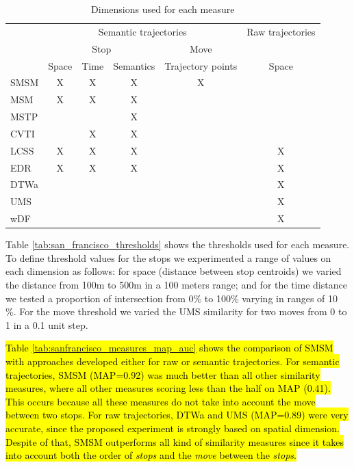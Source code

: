 \documentclass[12pt]{article}
\begin{document}
\begin{table}[!h]
\scriptsize
  \centering
  \begin{tabular}{|l|c|c|c|c|c|}
  	\hline
  & \multicolumn{4}{c|}{Semantic trajectories} & \multicolumn{1}{c|}{Raw trajectories} \\
 	\cline{2-5}
  & \multicolumn{3}{c|}{Stop} & \multicolumn{1}{c|}{Move} & \multicolumn{1}{c|}{} \\
 	\cline{2-6}
  & Space & Time & Semantics & Trajectory points & Space\\
  	\hline
 SMSM & X & X & X & X & \\
 MSM & X & X & X & &\\
 MSTP &  &  & X & & \\
 CVTI & & X & X & & \\
 LCSS & X & X & X & & X \\
 EDR & X & X & X & & X \\
 DTWa &  &  &  & & X \\
 UMS & & & & & X \\
 wDF & & & & & X \\
    \hline
  \end{tabular}
  \caption{Dimensions used for each measure}
  \label{tab:san_francisco_measures}
\end{table}

Table \ref{tab:san_francisco_thresholds} shows the  thresholds used for each measure. To define threshold values for the stops we experimented  a range of values on each dimension as follows: for space (distance between stop centroids) we varied the distance from 100m to 500m in a 100 meters range; and for the time distance we tested a proportion of intersection from 0\% to 100\% varying in ranges of 10 \%. For the move threshold we varied the UMS similarity for two moves from 0 to 1 in a 0.1 unit step.

\hl{Table {\ref{tab:sanfrancisco_measures_map_auc}} shows the comparison of SMSM with approaches developed either for raw or semantic trajectories.
For semantic trajectories, SMSM (MAP=0.92) was much better than all other similarity measures, where all other measures scoring less than the half on MAP (0.41). This occurs because all these measures do not take into account the move between two stops. For raw trajectories, DTWa and UMS (MAP=0.89) were very accurate, since the proposed experiment is strongly based on spatial dimension. Despite of that, SMSM outperforms all kind of similarity measures since it takes into account both the order of \emph{stops} and the \emph{move} between the \emph{stops}.}
\end{document}
